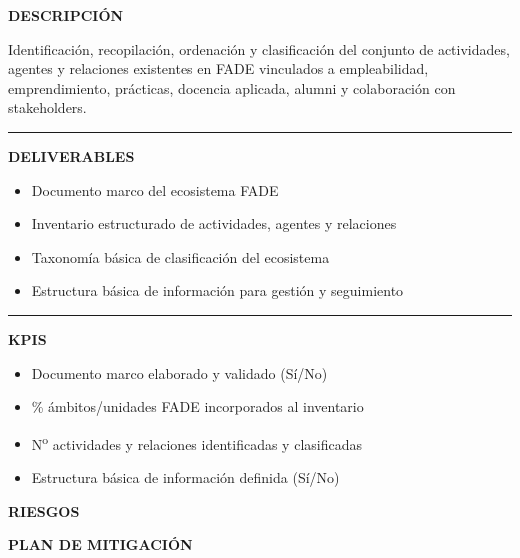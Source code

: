 \documentclass[11pt,a4paper]{scrreprt}
\newcommand{\fieldlabel}[1]{%
  {\footnotesize\sffamily\bfseries\color{mutedcolor}\MakeUppercase{#1}}\par\nopagebreak[4]
}
\newcommand{\fieldsep}{\vspace{3pt}\noindent\textcolor{bordercolor}{\rule{\linewidth}{0.4pt}}\vspace{3pt}\par}
\begin{document}
\begin{tcolorbox}[pabox={filcolor}{PA1.1 \enspace\textbullet\enspace Mapeo, inventario y clasificación del ecosistema FADE}]

\fieldlabel{Descripci\'on}
{\small Identificación, recopilación, ordenación y clasificación del conjunto de actividades, agentes y relaciones existentes en FADE vinculados a empleabilidad, emprendimiento, prácticas, docencia aplicada, alumni y colaboración con stakeholders.}\par
\fieldsep
\fieldlabel{Deliverables}
{\small \begin{itemize}[noitemsep,topsep=2pt]
\item Documento marco del ecosistema FADE
\item Inventario estructurado de actividades, agentes y relaciones
\item Taxonomía básica de clasificación del ecosistema
\item Estructura básica de información para gestión y seguimiento
\end{itemize}}\par
\fieldsep
\fieldlabel{KPIs}
{\small \begin{itemize}[noitemsep,topsep=2pt]
\item Documento marco elaborado y validado (Sí/No)
\item \% ámbitos/unidades FADE incorporados al inventario
\item N\textsuperscript{o} actividades y relaciones identificadas y clasificadas
\item Estructura básica de información definida (Sí/No)
\end{itemize}}\par
\end{tcolorbox}
\begin{tcolorbox}[riskbox]
{\footnotesize\sffamily\bfseries\color{red!50!black} RIESGOS}\par{}
\end{tcolorbox}
\begin{tcolorbox}[mitbox]
{\footnotesize\sffamily\bfseries\color{green!40!black} PLAN DE MITIGACI\'ON}\par{}
\end{tcolorbox}
\end{document}
